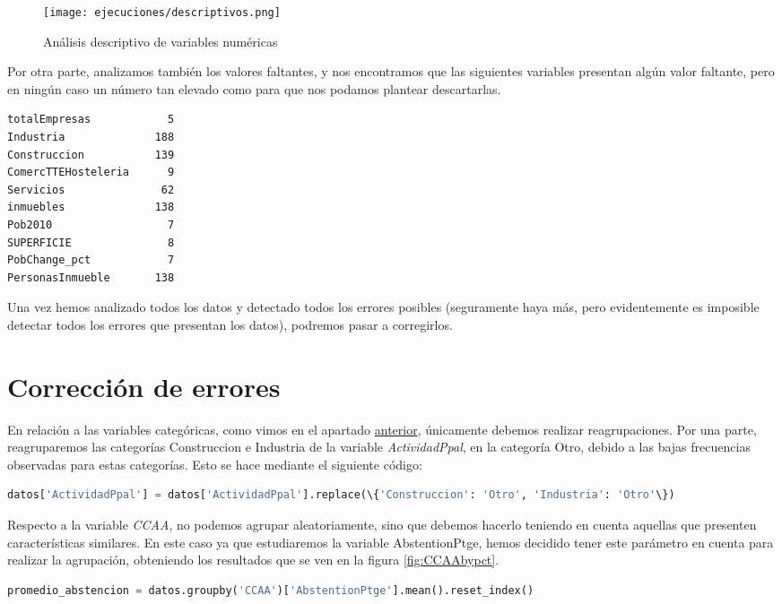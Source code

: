 \documentclass[a4paper,onecolumn]{extarticle}
\begin{document}
\begin{sloppypar}
\begin{wrapfigure}[13]{L}{8cm}
    \texttt{[image: ejecuciones/descriptivos.png]}
    \small{\caption{Análisis descriptivo de variables numéricas}}
\end{wrapfigure} 

Por otra parte, analizamos también los valores faltantes, y nos encontramos que las siguientes variables presentan algún valor faltante, pero en ningún caso 
un número tan elevado como para que nos podamos plantear descartarlas.
\begin{lstlisting}[numbers=none]
totalEmpresas            5
Industria              188
Construccion           139
ComercTTEHosteleria      9
Servicios               62
inmuebles              138
Pob2010                  7
SUPERFICIE               8
PobChange_pct            7
PersonasInmueble       138
\end{lstlisting}

Una vez hemos analizado todos los datos y detectado todos los errores posibles (seguramente haya más, pero evidentemente es imposible detectar todos los 
errores que presentan los datos), podremos pasar a corregirlos.
\\
\section{Corrección de errores}\label{errores}
En relación a las variables categóricas, como vimos en el apartado \hyperref[analisis]{anterior}, únicamente debemos realizar reagrupaciones. Por una parte,
reagruparemos las categorías Construccion e Industria de la variable \textit{ActividadPpal}, en la categoría Otro, debido a las bajas frecuencias observadas 
para estas categorías. Esto se hace mediante el siguiente código:
\begin{lstlisting}[language=Python,numbers=none]
datos['ActividadPpal'] = datos['ActividadPpal'].replace(\{'Construccion': 'Otro', 'Industria': 'Otro'\})
\end{lstlisting}

Respecto a la variable \textit{CCAA}, no podemos agrupar aleatoriamente, sino que debemos hacerlo teniendo en cuenta aquellas que presenten características 
similares. En este caso ya que estudiaremos la variable AbstentionPtge, hemos decidido tener este parámetro en cuenta para realizar la agrupación, obteniendo 
los resultados que se ven en la figura \ref{fig:CCAAbypct}.
\begin{lstlisting}[language=Python,numbers=none]
promedio_abstencion = datos.groupby('CCAA')['AbstentionPtge'].mean().reset_index()
\end{lstlisting}


\end{sloppypar}
\end{document}
